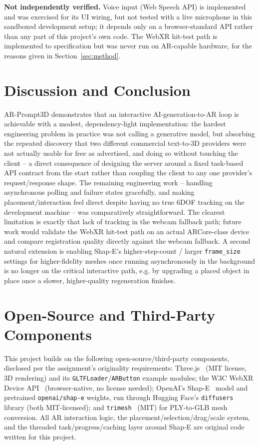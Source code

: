 \documentclass[sigconf,nonacm]{acmart}
\begin{document}
\textbf{Not independently verified.} Voice input (Web Speech API) is
implemented and was exercised for its UI wiring, but not tested with a
live microphone in this sandboxed development setup; it depends only on
a browser-standard API rather than any part of this project's own code.
The WebXR hit-test path is implemented to specification but was never
run on AR-capable hardware, for the reasons given in
Section~\ref{sec:method}.

\section{Discussion and Conclusion}
AR-Prompt3D demonstrates that an interactive AI-generation-to-AR loop is
achievable with a modest, dependency-light implementation: the hardest
engineering problem in practice was not calling a generative model, but
absorbing the repeated discovery that two different commercial
text-to-3D providers were not actually usable for free as advertised, and
doing so without touching the client -- a direct consequence of designing
the server around a fixed task-based API contract from the start rather
than coupling the client to any one provider's request/response shape.
The remaining engineering work -- handling asynchronous polling and
failure states gracefully, and making placement/interaction feel direct
despite having no true 6DOF tracking on the development machine -- was
comparatively straightforward. The clearest limitation is exactly that
lack of tracking in the webcam fallback path; future work would validate
the WebXR hit-test path on an actual ARCore-class device and compare
registration quality directly against the webcam fallback. A second
natural extension is enabling Shap-E's higher-step-count / larger
\texttt{frame\_size} settings for higher-fidelity meshes once running
asynchronously in the background is no longer on the critical interactive
path, e.g. by upgrading a placed object in place once a slower, higher-quality
regeneration finishes.

\section*{Open-Source and Third-Party Components}
This project builds on the following open-source/third-party components,
disclosed per the assignment's originality requirements: Three.js~\cite{threejs}
(MIT license, 3D rendering) and its \texttt{GLTFLoader}/\texttt{ARButton}
example modules; the W3C WebXR Device API~\cite{webxr-spec} (browser-native,
no license needed); OpenAI's Shap-E~\cite{jun2023shape} model and
pretrained \texttt{openai/shap-e} weights, run through Hugging Face's
\texttt{diffusers}~\cite{diffusers} library (both MIT-licensed); and
\texttt{trimesh}~\cite{trimesh} (MIT) for PLY-to-GLB mesh conversion. All
AR interaction logic, the placement/selection/drag/scale system, and the
threaded task/progress/caching layer around Shap-E are original code
written for this project.



\end{document}
